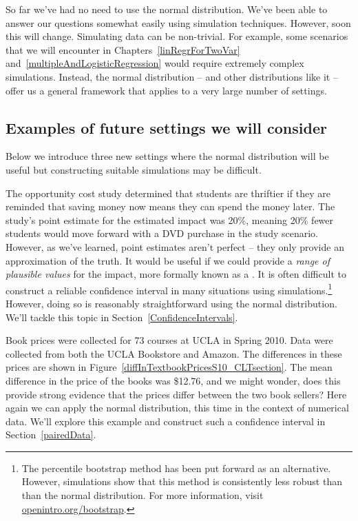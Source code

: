 So far we've had no need to use the normal distribution. We've been able to answer our questions somewhat easily using simulation techniques. However, soon this will change. Simulating data can be non-trivial. For example, some scenarios that we will encounter in Chapters~\ref{linRegrForTwoVar} and~\ref{multipleAndLogisticRegression} would require extremely complex simulations. Instead, the normal distribution -- and other distributions like it -- offer us a general framework that applies to a very large number of settings.


\subsection{Examples of future settings we will consider}

Below we introduce three new settings where the normal distribution will be useful but constructing suitable simulations may be difficult.

\begin{example}{The opportunity cost study determined that students are thriftier if they are reminded that saving money now means they can spend the money later. The study's point estimate for the estimated impact was 20\%, meaning 20\% fewer students would move forward with a DVD purchase in the study scenario. However, as we've learned, point estimates aren't perfect -- they only provide an approximation of the truth.}
It would be useful if we could provide a \emph{range of plausible values} for the impact, more formally known as a . It is often difficult to construct a reliable confidence interval in many situations using simulations.\footnote{The percentile bootstrap method has been put forward as an alternative. However, simulations show that this method is consistently less robust than than the normal distribution. For more information, visit \href{http://openintro.org/bootstrap}{openintro.org/bootstrap}.} However, doing so is reasonably straightforward using the normal distribution. We'll tackle this topic in Section~\ref{ConfidenceIntervals}.
\end{example}

\begin{example}{Book prices were collected for 73 courses at UCLA in Spring 2010. Data were collected from both the UCLA Bookstore and Amazon. The differences in these prices are shown in Figure~\ref{diffInTextbookPricesS10_CLTsection}. The mean difference in the price of the books was \$12.76, and we might wonder, does this provide strong evidence that the prices differ between the two book sellers?}
Here again we can apply the normal distribution, this time in the context of numerical data. We'll explore this example and construct such a confidence interval in Section~\ref{pairedData}.
\end{example}

